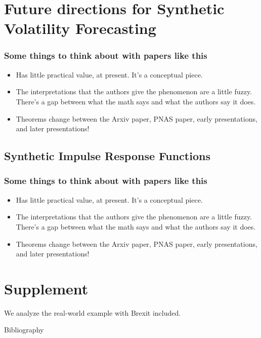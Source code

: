 \documentclass[pdf]{beamer}
\begin{document}
\section{Future directions for Synthetic Volatility Forecasting}

\begin{frame}
\frametitle{Some things to think about with papers like this}
\begin{itemize}
\item Has little practical value, at present.  It's a conceptual piece.
\item The interpretations that the authors give the phenomenon are a little fuzzy.  There's a gap between what the math says and what the authors say it does.
\item Theorems change between the Arxiv paper, PNAS paper, early presentations, and later presentations!
\end{itemize}
\end{frame}

\subsection{Synthetic Impulse Response Functions}

\begin{frame}
\frametitle{Some things to think about with papers like this}
\begin{itemize}
\item Has little practical value, at present.  It's a conceptual piece.
\item The interpretations that the authors give the phenomenon are a little fuzzy.  There's a gap between what the math says and what the authors say it does.
\item Theorems change between the Arxiv paper, PNAS paper, early presentations, and later presentations!
\end{itemize}
\end{frame}



\section{Supplement}
We analyze the real-world example with Brexit included.

\begin{frame}{Bibliography}
    
    
\end{frame}
\end{document}
